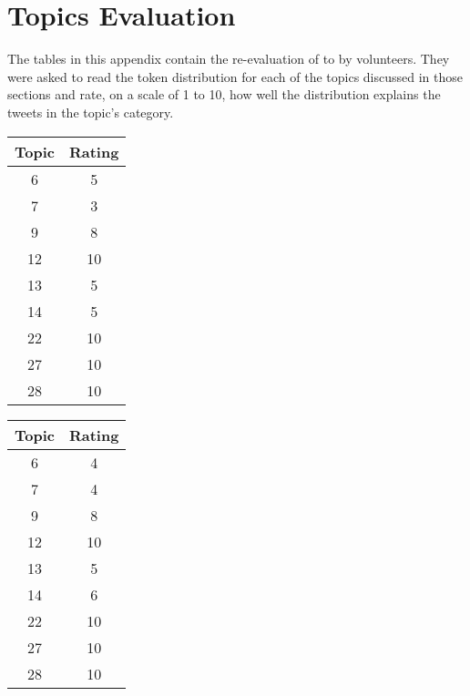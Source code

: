 \chapter{Topics Evaluation}
\label{cha:appx-topics-evaluation}
The tables in this appendix contain the re-evaluation of  to
 by volunteers. They were asked to read the token distribution for each of
the topics discussed in those sections and rate, on a scale of 1 to 10, how well the distribution
explains the tweets in the topic's category.

\begin{table}[H]
  \begin{subtable}{.5\linewidth}
    \centering
    \begin{tabular}{c c} \toprule
      Topic & Rating \\ \midrule
      6     & 5   \\ \midrule
      7     & 3  \\ \midrule
      9     & 8  \\ \midrule
      12    & 10   \\ \midrule
      13    & 5   \\ \midrule
      14    & 5   \\ \midrule
      22    & 10   \\ \midrule
      27    & 10   \\ \midrule
      28    & 10   \\ \bottomrule
    \end{tabular}
  \end{subtable}
  \begin{subtable}{.5\linewidth}
    \centering
    \begin{tabular}{c c} \toprule
      Topic & Rating \\ \midrule
      6     & 4  \\ \midrule
      7     & 4  \\ \midrule
      9     & 8  \\ \midrule
      12    & 10   \\ \midrule
      13    & 5   \\ \midrule
      14    & 6   \\ \midrule
      22    & 10   \\ \midrule
      27    & 10   \\ \midrule
      28    & 10   \\ \bottomrule
    \end{tabular}
  \end{subtable}
\end{table}


